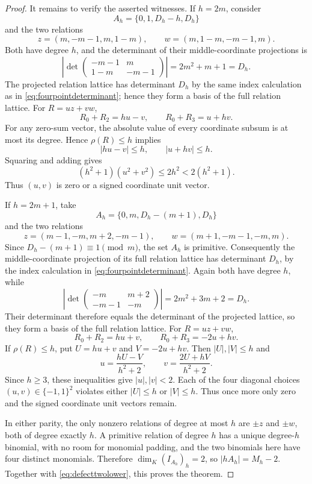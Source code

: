 \documentclass[10pt,a4paper]{amsart}
\begin{document}
\begin{proof}
It remains to verify the asserted witnesses.  If $h=2m$, consider
\[
 A_h=\{0,1,D_h-h,D_h\}
\]
and the two relations
\[
 z=(m,-m-1,m,1-m),\qquad
 w=(m,1-m,-m-1,m).
\]
Both have degree $h$, and the determinant of their middle-coordinate
projections is
\[
 \left|\det
 \begin{pmatrix}
  -m-1&m\\
  1-m&-m-1
 \end{pmatrix}\right|=2m^2+m+1=D_h.
\]
The projected relation lattice has determinant $D_h$ by the same index
calculation as in \eqref{eq:fourpointdeterminant}; hence they form a basis of
the full relation lattice.  For $R=uz+vw$,
\[
 R_0+R_2=hu-v,\qquad R_0+R_3=u+hv.
\]
For any zero-sum vector, the absolute value of every coordinate subsum is
at most its degree.  Hence $\rho(R)\leq h$ implies
\[
 |hu-v|\leq h,\qquad |u+hv|\leq h.
\]
Squaring and adding gives
\[
 (h^2+1)(u^2+v^2)\leq2h^2<2(h^2+1).
\]
Thus $(u,v)$ is zero or a signed coordinate unit vector.

If $h=2m+1$, take
\[
 A_h=\{0,m,D_h-(m+1),D_h\}
\]
and the two relations
\[
 z=(m-1,-m,m+2,-m-1),\qquad
 w=(m+1,-m-1,-m,m).
\]
Since $D_h-(m+1)\equiv1\pmod m$, the set $A_h$ is primitive.  Consequently
the middle-coordinate projection of its full relation lattice has determinant
$D_h$, by the index calculation in \eqref{eq:fourpointdeterminant}.
Again both have degree $h$, while
\[
 \left|\det
 \begin{pmatrix}
  -m&m+2\\
  -m-1&-m
 \end{pmatrix}\right|=2m^2+3m+2=D_h.
\]
Their determinant therefore equals the determinant of the projected lattice,
so they form a basis of the full relation lattice.  For $R=uz+vw$,
\[
 R_0+R_2=hu+v,\qquad R_0+R_3=-2u+hv.
\]
If $\rho(R)\leq h$, put $U=hu+v$ and $V=-2u+hv$.
Then $|U|,|V|\leq h$ and
\[
 u=\frac{hU-V}{h^2+2},\qquad
 v=\frac{2U+hV}{h^2+2}.
\]
Since $h\geq3$, these inequalities give $|u|,|v|<2$.  Each of the four
diagonal choices $(u,v)\in\{-1,1\}^2$ violates either $|U|\leq h$ or
$|V|\leq h$.  Thus once more only zero and the signed coordinate unit
vectors remain.

In either parity, the only nonzero relations of degree at most $h$ are
$\pm z$ and $\pm w$, both of degree exactly $h$.  A primitive relation of
degree $h$ has a unique degree-$h$ binomial, with no room for monomial
padding, and the two binomials here have four distinct monomials.  Therefore
$\dim_K(I_{A_h})_h=2$, so $|hA_h|=M_h-2$.  Together with
\eqref{eq:defecttwolower}, this proves the theorem.
\end{proof}
\end{document}
